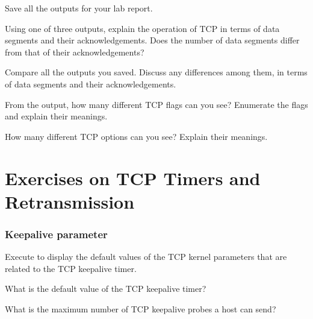 \documentclass{../UTNetLab}
\begin{document}
Save all the  outputs for your lab report.

\begin{report}
    \item Using one of three  outputs, explain the operation of TCP in terms of data segments and their acknowledgements.
    Does the number of data segments differ from that of their acknowledgements?

    Compare all the  outputs you saved.
    Discuss any differences among them, in terms of data segments and their acknowledgements.

    \item From the  output, how many different TCP flags can you see? Enumerate the flags and explain their meanings.

    How many different TCP options can you see?
    Explain their meanings.
\end{report}

\part{Exercises on TCP Timers and Retransmission}
\section{Keepalive parameter}
Execute  to display the default values of the TCP kernel parameters that are related to the TCP keepalive timer.

\begin{report}
    \item What is the default value of the TCP keepalive timer?

    \item What is the maximum number of TCP keepalive probes a host can send?
\end{report}
\end{document}
